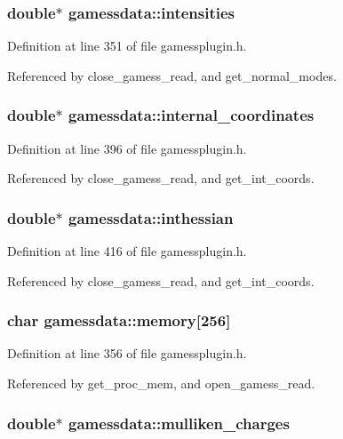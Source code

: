 \subsubsection{\setlength{\rightskip}{0pt plus 5cm}double$\ast$ gamessdata::intensities}\label{structgamessdata_m29}




Definition at line 351 of file gamessplugin.h.

Referenced by close\_\-gamess\_\-read, and get\_\-normal\_\-modes.
\subsubsection{\setlength{\rightskip}{0pt plus 5cm}double$\ast$ gamessdata::internal\_\-coordinates}\label{structgamessdata_m48}




Definition at line 396 of file gamessplugin.h.

Referenced by close\_\-gamess\_\-read, and get\_\-int\_\-coords.
\subsubsection{\setlength{\rightskip}{0pt plus 5cm}double$\ast$ gamessdata::inthessian}\label{structgamessdata_m54}




Definition at line 416 of file gamessplugin.h.

Referenced by close\_\-gamess\_\-read, and get\_\-int\_\-coords.
\subsubsection{\setlength{\rightskip}{0pt plus 5cm}char gamessdata::memory[256]}\label{structgamessdata_m32}




Definition at line 356 of file gamessplugin.h.

Referenced by get\_\-proc\_\-mem, and open\_\-gamess\_\-read.
\subsubsection{\setlength{\rightskip}{0pt plus 5cm}double$\ast$ gamessdata::mulliken\_\-charges}\label{structgamessdata_m33}




